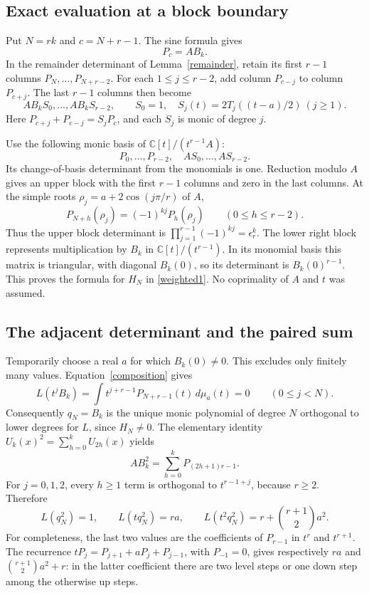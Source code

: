 \documentclass[10pt]{article}
\begin{document}
\subsection*{Exact evaluation at a block boundary}
Put $N=rk$ and $c=N+r-1$. The sine formula gives
\begin{equation}\label{composition}
 P_c=A B_k.
\end{equation}
In the remainder determinant of Lemma~\ref{remainder}, retain its
first $r-1$ columns $P_N,\ldots,P_{N+r-2}$. For each
$1\le j\le r-2$, add column $P_{c-j}$ to column $P_{c+j}$.
The last $r-1$ columns then become
\[
 A B_k S_0,\ldots,A B_k S_{r-2},\qquad
 S_0=1,\quad S_j(t)=2T_j((t-a)/2)\ (j\ge1).
\]
Here $P_{c+j}+P_{c-j}=S_jP_c$, and each $S_j$ is monic of degree $j$.

Use the following monic basis of $\mathbb C[t]/(t^{r-1}A)$:
\[
 P_0,\ldots,P_{r-2},\quad A S_0,\ldots,A S_{r-2}.
\]
Its change-of-basis determinant from the monomials is one. Reduction
modulo $A$ gives an upper block with the first $r-1$ columns and zero
in the last columns. At the simple roots
$\rho_j=a+2\cos(j\pi/r)$ of $A$,
\[
 P_{N+h}(\rho_j)=(-1)^{kj}P_h(\rho_j)\qquad(0\le h\le r-2).
\]
Thus the upper block determinant is
$\prod_{j=1}^{r-1}(-1)^{kj}=\epsilon_r^k$.
The lower right block represents multiplication by $B_k$ in
$\mathbb C[t]/(t^{r-1})$. In its monomial basis this matrix is
triangular, with diagonal $B_k(0)$, so its determinant is
$B_k(0)^{r-1}$. This proves the formula for $H_N$ in
\eqref{weighted1}. No coprimality of $A$ and $t$ was assumed.

\subsection*{The adjacent determinant and the paired sum}
Temporarily choose a real $a$ for which $B_k(0)\ne0$.
This excludes only finitely many values. Equation~\eqref{composition}
gives
\[
 L(t^j B_k)=\int t^{j+r-1}P_{N+r-1}(t)\,d\mu_a(t)=0\qquad(0\le j<N).
\]
Consequently $q_N=B_k$ is the unique monic polynomial of degree $N$
orthogonal to lower degrees for $L$, since $H_N\ne0$.
The elementary identity $U_k(x)^2=\sum_{h=0}^k U_{2h}(x)$ yields
\begin{equation}\label{squared}
 A B_k^2=\sum_{h=0}^k P_{(2h+1)r-1}.
\end{equation}
For $j=0,1,2$, every $h\ge1$ term is orthogonal to $t^{r-1+j}$,
because $r\ge2$. Therefore
\begin{equation}\label{three}
 L(q_N^2)=1,\qquad L(tq_N^2)=ra,\qquad
 L(t^2q_N^2)=r+\binom{r+1}{2}a^2.
\end{equation}
For completeness, the last two values are the coefficients of
$P_{r-1}$ in $t^r$ and $t^{r+1}$. The recurrence
$tP_j=P_{j+1}+aP_j+P_{j-1}$, with $P_{-1}=0$, gives respectively
$ra$ and $\binom{r+1}{2}a^2+r$: in the latter coefficient there
are two level steps or one down step among the otherwise up steps.
\end{document}

